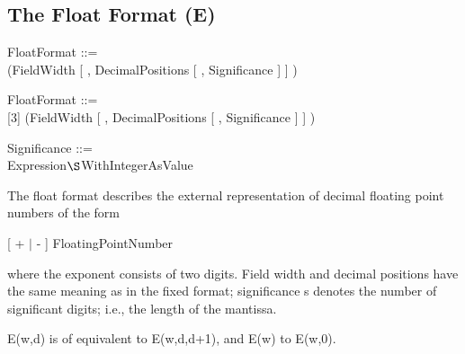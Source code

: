 \subsection{The Float Format (E)}   %
\label{sec_dation_e_format}

\begin{removed}
FloatFormat ::=\\
 (FieldWidth [ , DecimalPositions [ , Significance ] ] )
\end{removed}
\begin{accepted}
FloatFormat ::=\\
[3] (FieldWidth [ , DecimalPositions [ , Significance ] ] )
\end{accepted}

Significance ::= \\
\x Expression$\S $WithIntegerAsValue

The float format describes the external representation of decimal
floating point numbers of the form

[ + $\mid$ - ] FloatingPointNumber

where the exponent consists of two 
 digits.
 Field width and decimal
positions have the same meaning as in the fixed format; significance s
denotes the number of significant digits; i.e., the length of the
mantissa.

E(w,d) is of equivalent to E(w,d,d+1), and E(w) to E(w,0).

